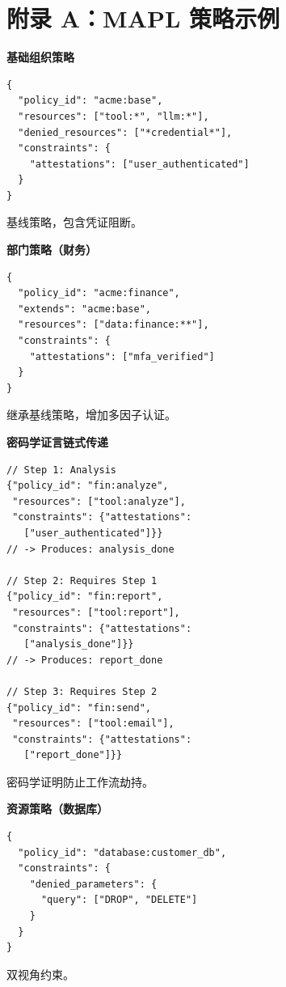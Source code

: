 \appendix
\section*{附录 A：MAPL 策略示例}
\label{appendix:policy-examples}

{\small
\noindent\begin{minipage}[t]{0.48\columnwidth}
\textbf{基础组织策略}
\begin{lstlisting}[basicstyle=\ttfamily\scriptsize]
{
  "policy_id": "acme:base",
  "resources": ["tool:*", "llm:*"],
  "denied_resources": ["*credential*"],
  "constraints": {
    "attestations": ["user_authenticated"]
  }
}
\end{lstlisting}
基线策略，包含凭证阻断。
\end{minipage}
\hfill
\begin{minipage}[t]{0.48\columnwidth}
\textbf{部门策略（财务）}
\begin{lstlisting}[basicstyle=\ttfamily\scriptsize]
{
  "policy_id": "acme:finance",
  "extends": "acme:base",
  "resources": ["data:finance:**"],
  "constraints": {
    "attestations": ["mfa_verified"]
  }
}
\end{lstlisting}
继承基线策略，增加多因子认证。
\end{minipage}

\vspace{0.5em}
\noindent\begin{minipage}[t]{0.48\columnwidth}
\textbf{密码学证言链式传递}
\begin{lstlisting}[basicstyle=\ttfamily\scriptsize]
// Step 1: Analysis
{"policy_id": "fin:analyze",
 "resources": ["tool:analyze"],
 "constraints": {"attestations":
   ["user_authenticated"]}}
// -> Produces: analysis_done

// Step 2: Requires Step 1
{"policy_id": "fin:report",
 "resources": ["tool:report"],
 "constraints": {"attestations":
   ["analysis_done"]}}
// -> Produces: report_done

// Step 3: Requires Step 2
{"policy_id": "fin:send",
 "resources": ["tool:email"],
 "constraints": {"attestations":
   ["report_done"]}}
\end{lstlisting}
密码学证明防止工作流劫持。
\end{minipage}
\hfill
\begin{minipage}[t]{0.48\columnwidth}
\textbf{资源策略（数据库）}
\begin{lstlisting}[basicstyle=\ttfamily\scriptsize]
{
  "policy_id": "database:customer_db",
  "constraints": {
    "denied_parameters": {
      "query": ["DROP", "DELETE"]
    }
  }
}
\end{lstlisting}
双视角约束。
\end{minipage}

}
